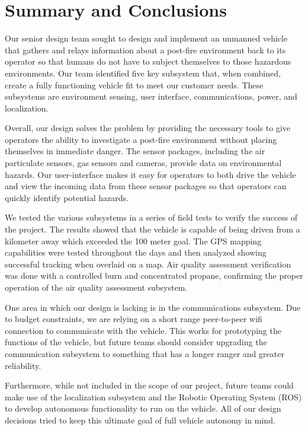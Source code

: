 \chapter{Summary and Conclusions}

Our senior design team sought to design and implement an unmanned vehicle that gathers and relays information about a post-fire environment back to its operator so that humans do not have to subject themselves to those hazardous environments. Our team identified five key subsystem that, when combined, create a fully functioning vehicle fit to meet our customer needs.  These subsystems are environment sensing, user interface, communications, power, and localization.

Overall, our design solves the problem by providing the necessary tools to give operators the ability to investigate a post-fire environment without placing themselves in immediate danger. The sensor packages, including the air particulate sensors, gas sensors and cameras, provide data on environmental hazards. Our user-interface makes it easy for operators to both drive the vehicle and view the incoming data from these sensor packages so that operators can quickly identify potential hazards.

We tested the various subsystems in a series of field tests to verify the success of the project. The results showed that the vehicle is capable of being driven from a kilometer away which exceeded the 100 meter goal. The GPS mapping capabilities were tested throughout the days and then analyzed showing successful tracking when overlaid on a map. Air quality assessment verification was done with a controlled burn and concentrated propane, confirming the proper operation of the air quality assessment subsystem. 

One area in which our design is lacking is in the communications subsystem.  Due to budget constraints, we are relying on a short range peer-to-peer wifi connection to communicate with the vehicle.  This works for prototyping the functions of the vehicle, but future teams should consider upgrading the communication subsystem to something that has a longer ranger and greater reliability.  

Furthermore, while not included in the scope of our project, future teams could make use of the localization subsystem and the Robotic Operating System (ROS) to develop autonomous functionality to run on the vehicle. All of our design decisions tried to keep this ultimate goal of full vehicle autonomy in mind. 

